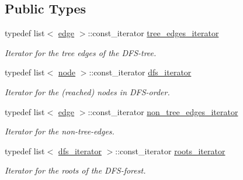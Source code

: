 \subsection*{Public Types}
\begin{DoxyCompactItemize}
\item 
\mbox{\label{classdfs_a0eee0ddec5343c05f617d6d7aabb6d19}} 
typedef list$<$ \mbox{\hyperlink{classedge}{edge}} $>$\+::const\+\_\+iterator \mbox{\hyperlink{classdfs_a0eee0ddec5343c05f617d6d7aabb6d19}{tree\+\_\+edges\+\_\+iterator}}
\begin{DoxyCompactList}\small\item\em Iterator for the tree edges of the D\+F\+S-\/tree. \end{DoxyCompactList}\item 
\mbox{\label{classdfs_ad040ddae37492e18c8e029406d667bd9}} 
typedef list$<$ \mbox{\hyperlink{classnode}{node}} $>$\+::const\+\_\+iterator \mbox{\hyperlink{classdfs_ad040ddae37492e18c8e029406d667bd9}{dfs\+\_\+iterator}}
\begin{DoxyCompactList}\small\item\em Iterator for the (reached) nodes in D\+F\+S-\/order. \end{DoxyCompactList}\item 
\mbox{\label{classdfs_ae7301f3d4417e60fb3a499180375194e}} 
typedef list$<$ \mbox{\hyperlink{classedge}{edge}} $>$\+::const\+\_\+iterator \mbox{\hyperlink{classdfs_ae7301f3d4417e60fb3a499180375194e}{non\+\_\+tree\+\_\+edges\+\_\+iterator}}
\begin{DoxyCompactList}\small\item\em Iterator for the non-\/tree-\/edges. \end{DoxyCompactList}\item 
\mbox{\label{classdfs_a17cb59c8a1fead11fa6b0c85cf5a478e}} 
typedef list$<$ \mbox{\hyperlink{classdfs_ad040ddae37492e18c8e029406d667bd9}{dfs\+\_\+iterator}} $>$\+::const\+\_\+iterator \mbox{\hyperlink{classdfs_a17cb59c8a1fead11fa6b0c85cf5a478e}{roots\+\_\+iterator}}
\begin{DoxyCompactList}\small\item\em Iterator for the roots of the D\+F\+S-\/forest. \end{DoxyCompactList}\end{DoxyCompactItemize}
